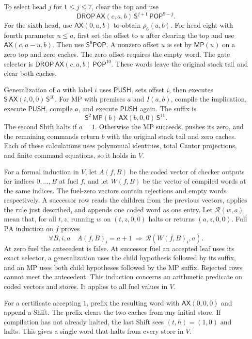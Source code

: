 \documentclass[11pt,letterpaper]{article}
\newcommand{\PA}{\mathrm{PA}}
\newcommand{\ax}{\mathsf{AX}}
\newcommand{\mpc}{\mathsf{MP}}
\newcommand{\shift}{\mathsf{S}}
\newcommand{\push}{\mathsf{PUSH}}
\newcommand{\pophead}{\mathsf{POP}}
\newcommand{\discard}{\mathsf{DROP}}
\begin{document}
To select head $j$ for $1\leq j\leq 7$, clear the top and use
\[
     \discard\,\ax(c,a,b)\,\shift^{j+1}\,\pophead^{9-j}.
\]
For the sixth head, use $\ax(0,a,b)$ to obtain $\rho_6(a,b)$.
For head eight with fourth parameter $u\leq a$, first set the
offset to $u$ after clearing the top and use $\ax(c,a-u,b)$.
Then use $\shift^9\pophead$. A nonzero offset $u$ is set by
$\mpc(u)$ on a zero top and zero caches. The zero offset requires
the empty word. The gate selector is
$\discard\,\ax(c,a,b)\,\pophead^{10}$. These words leave the
original stack tail and clear both caches.

Generalization of $a$ with label $i$ uses $\push$, sets offset $i$,
then executes $\shift\,\ax(i,0,0)\,\shift^{10}$. For MP with
premises $a$ and $I(a,b)$, compile the implication, execute $\push$,
compile $a$, and execute $\push$ again. The suffix is
\[
       \shift^2\,\mpc(b)\,\ax(b,0,0)\,\shift^{11}.
\]
The second Shift halts if $a=1$. Otherwise the MP succeeds, pushes
its zero, and the remaining commands return $b$ with the original
stack tail and zero caches. Each of these calculations uses
polynomial identities, total Cantor projections, and finite
command equations, so it holds in $V$.

For a formal induction in $V$, let $A(f,B)$ be the coded vector of
checker outputs for indices $0,\ldots,B$ at fuel $f$, and let
$W(f,B)$ be the vector of compiled words at the same indices.
The fuel-zero vectors contain rejections and empty words respectively.
A successor row reads the children from the previous vectors,
applies the rule just described, and appends one coded word as one
entry. Let $\mathcal R(w,a)$ mean that, for all $t,z$, running $w$
on $(t,z,0,0)$ halts or returns $(a,z,0,0)$. Full $\PA$ induction on
$f$ proves
\[
 \forall B,i,a\quad A(f,B)_i=a+1
                    \ \Longrightarrow\ \mathcal R(W(f,B)_i,a).
\]
At zero fuel the antecedent is false. At successor fuel an accepted
leaf uses its exact selector, a generalization uses the child
hypothesis followed by its suffix, and an MP uses both child
hypotheses followed by the MP suffix. Rejected rows cannot meet the
antecedent. This induction concerns an arithmetic predicate on coded
vectors and stores. It applies to all fuel values in $V$.

For a certificate accepting $1$, prefix the resulting word with
$\ax(0,0,0)$ and append a Shift. The prefix clears the two caches
from any initial store. If compilation has not already halted,
the last Shift sees $(t,h)=(1,0)$ and halts. This gives a
single word that halts from every store in $V$.
\end{document}
